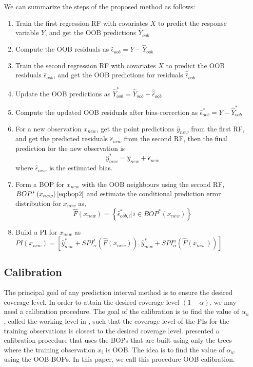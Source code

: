 We can summarize the steps of the proposed method as follows:
\begin{enumerate}
    \item Train the first regression RF with covariates $X$ to predict the response variable $Y$, and get the OOB predictions $\hat Y_{oob}$
    \item Compute the OOB residuals as $\hat \epsilon_{oob}^{} = Y-\hat Y_{oob}^{}$
    \item Train the second regression RF with covariates $X$ to predict the OOB residuals $\hat \epsilon_{oob}^{}$, and get the OOB predictions for residuals $\hat{\hat \epsilon}_{oob}^{}$
    \item Update the OOB predictions as $\hat Y_{oob}^* = \hat Y_{oob}^{} + \hat{\hat \epsilon}_{oob}^{}$
    \item Compute the updated OOB residuals after bias-correction as $\hat \epsilon_{oob}^{*} = Y - \hat Y_{oob}^*$
    \item For a new observation $x_{new}$, get the point predictions $\hat y_{new}$ from the first RF, and get the predicted residuals $\hat \epsilon_{new}$ from the second RF, then the final prediction for the new observation is $$\hat y_{new}^{*} = \hat y_{new}^{} + \hat \epsilon_{new}^{}$$ where $\hat \epsilon_{new}^{}$ is the estimated bias.
    \item Form a BOP for $x_{new}$ with the OOB neighbours using the second RF, $BOP^{*}\left(x_{new}\right) \eqref{eq:bop2}$ and estimate the conditional prediction error distribution for $x_{new}$ as, $$\hat{F}\left(x_{new}^{}\right) = \left \{\hat \epsilon_{oob,i}^{*} | i \in BOP^{*}\left(x_{new}\right)\right \}$$
    \item Build a PI for $x_{new}$ as $PI\left(x_{new}\right) = \left[\hat y^{*}_{new} + SPI^l_{\alpha}\left(\hat{F}\left(x_{new}\right)\right), \hat y^{*}_{new} + SPI^u_{\alpha}\left(\hat{F}\left(x_{new}\right)\right)\right]$
\end{enumerate}

\subsection{Calibration}
The principal goal of any prediction interval method is to ensure the desired coverage level. In order to attain the desired coverage level $\left(1-\alpha\right)$, we may need a calibration procedure. The goal of the calibration is to find the value of $\alpha_w$, called the working level in \citet{roy_prediction_2020}, such that the coverage level of the PIs for the training observations is closest to the desired coverage level. \citet{roy_prediction_2020} presented a calibration procedure that uses the BOPs that are built using only the trees where the training observation $x_i$ is OOB. The idea is to find the value of $\alpha_w$ using the OOB-BOPs. In this paper, we call this procedure OOB calibration. 


